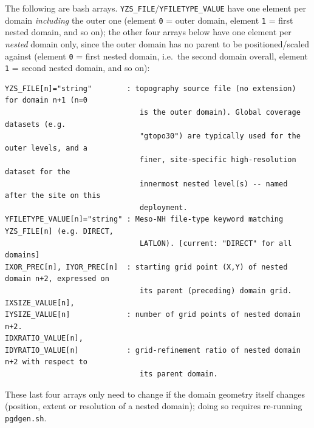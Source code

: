 The following are bash arrays. \texttt{YZS\_FILE}/\texttt{YFILETYPE\_VALUE} have one element per
domain \emph{including} the outer one (element \texttt{0} = outer domain, element \texttt{1} = first
nested domain, and so on); the other four arrays below have one element per \emph{nested} domain only,
since the outer domain has no parent to be positioned/scaled against (element \texttt{0} = first
nested domain, i.e.\ the second domain overall, element \texttt{1} = second nested domain, and so on):
\begin{lstlisting}
YZS_FILE[n]="string"        : topography source file (no extension) for domain n+1 (n=0
                               is the outer domain). Global coverage datasets (e.g.
                               "gtopo30") are typically used for the outer levels, and a
                               finer, site-specific high-resolution dataset for the
                               innermost nested level(s) -- named after the site on this
                               deployment.
YFILETYPE_VALUE[n]="string" : Meso-NH file-type keyword matching YZS_FILE[n] (e.g. DIRECT,
                               LATLON). [current: "DIRECT" for all domains]
IXOR_PREC[n], IYOR_PREC[n]  : starting grid point (X,Y) of nested domain n+2, expressed on
                               its parent (preceding) domain grid.
IXSIZE_VALUE[n],
IYSIZE_VALUE[n]             : number of grid points of nested domain n+2.
IDXRATIO_VALUE[n],
IDYRATIO_VALUE[n]           : grid-refinement ratio of nested domain n+2 with respect to
                               its parent domain.
\end{lstlisting}
These last four arrays only need to change if the domain geometry itself changes (position, extent or
resolution of a nested domain); doing so requires re-running \texttt{pgdgen.sh}.
